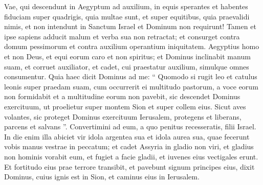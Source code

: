 \begin{biblechapter}
\begin{biblechapter}
\begin{biblechapter}
\begin{biblechapter}
\begin{biblechapter}
\begin{biblechapter}
\begin{biblechapter}
\begin{biblechapter}
\begin{biblechapter}
\begin{biblechapter}
\begin{biblechapter}
\begin{biblechapter}
\begin{biblechapter}
\begin{biblechapter}
\begin{biblechapter}
\begin{biblechapter}
\begin{biblechapter}
\begin{biblechapter}
\begin{biblechapter}
\begin{biblechapter}
\begin{biblechapter}
\begin{biblechapter}
\begin{biblechapter}
\begin{biblechapter}
\begin{biblechapter}
\begin{biblechapter}
\begin{biblechapter}
\begin{biblechapter}
\begin{biblechapter}
\begin{biblechapter}
\begin{biblechapter}
\verse Vae, qui descendunt in Aegyptum ad auxilium,
 in equis sperantes
 et habentes fiduciam super quadrigis, quia multae sunt,
 et super equitibus, quia praevalidi nimis,
 et non intendunt in Sanctum Israel
 et Dominum non requirunt!
 \verse Tamen et ipse sapiens adducit malum
 et verba sua non retractat;
 et consurget contra domum pessimorum
 et contra auxilium operantium iniquitatem.
 \verse Aegyptius homo et non Deus,
 et equi eorum caro et non spiritus;
 et Dominus inclinabit manum suam,
 et corruet auxiliator,
 et cadet, cui praestatur auxilium,
 simulque omnes consumentur.
 \verse Quia haec dicit Dominus ad me:
 “ Quomodo si rugit leo et catulus leonis super praedam suam,
 cum occurrerit ei multitudo pastorum,
 a voce eorum non formidabit et a multitudine eorum non pavebit,
 sic descendet Dominus exercituum, ut proelietur super montem Sion et super collem eius.
 \verse Sicut aves volantes,
 sic proteget Dominus exercituum Ierusalem,
 protegens et liberans,
 parcens et salvans ”.
 \verse Convertimini ad eum, a quo penitus recesseratis,
 filii Israel.
 \verse In die enim illa abiciet vir
 idola argentea sua et idola aurea sua,
 quae fecerunt vobis manus vestrae in peccatum;
 \verse et cadet Assyria in gladio non viri,
 et gladius non hominis vorabit eum,
 et fugiet a facie gladii,
 et iuvenes eius vectigales erunt.
 \verse Et fortitudo eius prae terrore transibit,
 et pavebunt signum principes eius,
 dixit Dominus, cuius ignis est in Sion,
 et caminus eius in Ierusalem.
 

\end{biblechapter}
\end{biblechapter}
\end{biblechapter}
\end{biblechapter}
\end{biblechapter}
\end{biblechapter}
\end{biblechapter}
\end{biblechapter}
\end{biblechapter}
\end{biblechapter}
\end{biblechapter}
\end{biblechapter}
\end{biblechapter}
\end{biblechapter}
\end{biblechapter}
\end{biblechapter}
\end{biblechapter}
\end{biblechapter}
\end{biblechapter}
\end{biblechapter}
\end{biblechapter}
\end{biblechapter}
\end{biblechapter}
\end{biblechapter}
\end{biblechapter}
\end{biblechapter}
\end{biblechapter}
\end{biblechapter}
\end{biblechapter}
\end{biblechapter}
\end{biblechapter}
